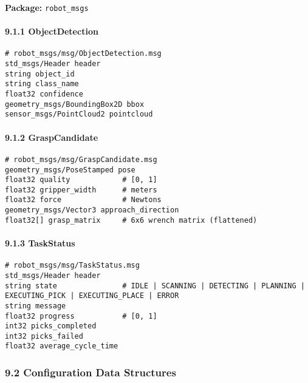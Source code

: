 \documentclass[
]{article}
\begin{document}
\textbf{Package:} \texttt{robot\_msgs}

\hypertarget{objectdetection}{%
\paragraph{9.1.1 ObjectDetection}\label{objectdetection}}

\begin{verbatim}
# robot_msgs/msg/ObjectDetection.msg
std_msgs/Header header
string object_id
string class_name
float32 confidence
geometry_msgs/BoundingBox2D bbox
sensor_msgs/PointCloud2 pointcloud
\end{verbatim}

\hypertarget{graspcandidate}{%
\paragraph{9.1.2 GraspCandidate}\label{graspcandidate}}

\begin{verbatim}
# robot_msgs/msg/GraspCandidate.msg
geometry_msgs/PoseStamped pose
float32 quality            # [0, 1]
float32 gripper_width      # meters
float32 force              # Newtons
geometry_msgs/Vector3 approach_direction
float32[] grasp_matrix     # 6x6 wrench matrix (flattened)
\end{verbatim}

\hypertarget{taskstatus}{%
\paragraph{9.1.3 TaskStatus}\label{taskstatus}}

\begin{verbatim}
# robot_msgs/msg/TaskStatus.msg
std_msgs/Header header
string state               # IDLE | SCANNING | DETECTING | PLANNING | EXECUTING_PICK | EXECUTING_PLACE | ERROR
string message
float32 progress           # [0, 1]
int32 picks_completed
int32 picks_failed
float32 average_cycle_time
\end{verbatim}

\hypertarget{configuration-data-structures}{%
\subsubsection{9.2 Configuration Data
Structures}\label{configuration-data-structures}}
\end{document}
